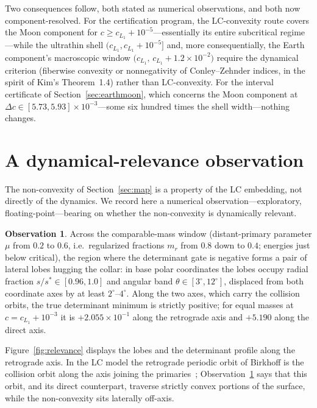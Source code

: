 \documentclass[11pt,reqno]{amsart}
\theoremstyle{plain}
\theoremstyle{definition}
\newtheorem{observation}[theorem]{Observation}
\begin{document}
Two consequences follow, both stated as numerical observations, and both now component-resolved. For the certification program, the LC-convexity route covers the Moon component for $c\ge c_{L_1}+10^{-5}$---essentially its entire subcritical regime---while the ultrathin shell $\bigl(c_{L_1},c_{L_1}+10^{-5}\bigr]$ and, more consequentially, the Earth component's macroscopic window $\bigl(c_{L_1},\,c_{L_1}+1.2\times10^{-2}\bigr)$ require the dynamical criterion (fiberwise convexity or nonnegativity of Conley--Zehnder indices, in the spirit of Kim's Theorem~1.4) rather than LC-convexity. For the interval certificate of Section~\ref{sec:earthmoon}, which concerns the Moon component at $\Delta c\in[5.73,5.93]\times 10^{-3}$---some six hundred times the shell width---nothing changes.

\section{A dynamical-relevance observation}\label{sec:relevance}

The non-convexity of Section~\ref{sec:map} is a property of the LC embedding, not directly of the dynamics. We record here a numerical observation---exploratory, floating-point---bearing on whether the non-convexity is dynamically relevant.

\begin{observation}\label{obs:abas}
Across the comparable-mass window (distant-primary parameter $\mu$ from $0.2$ to $0.6$, i.e.\ regularized fractions $m_r$ from $0.8$ down to $0.4$; energies just below critical), the region where the determinant gate is negative forms a pair of lateral lobes hugging the collar: in base polar coordinates the lobes occupy radial fraction $s/s^\ast\in[0.96,1.0]$ and angular band $\theta\in[3^\circ,12^\circ]$, displaced from both coordinate axes by at least $2^\circ$--$4^\circ$. Along the two axes, which carry the collision orbits, the true determinant minimum is strictly positive; for equal masses at $c=c_{L_1}+10^{-3}$ it is $+2.055\times10^{-1}$ along the retrograde axis and $+5.190$ along the direct axis.
\end{observation}

Figure~\ref{fig:relevance} displays the lobes and the determinant profile along the retrograde axis. In the LC model the retrograde periodic orbit of Birkhoff is the collision orbit along the axis joining the primaries~\cite{Kim}; Observation~\ref{obs:abas} says that this orbit, and its direct counterpart, traverse strictly convex portions of the surface, while the non-convexity sits laterally off-axis.
\end{document}
